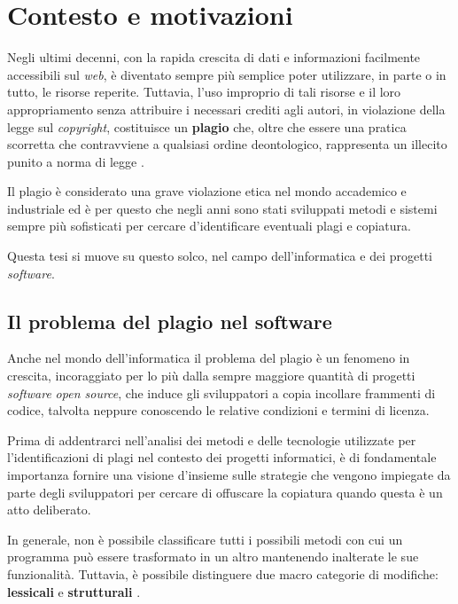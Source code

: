 \chapter{Contesto e motivazioni}
\label{chapter:context-and-motivations}

Negli ultimi decenni, con la rapida crescita di dati e informazioni facilmente accessibili sul \textit{web}, è diventato sempre più semplice poter utilizzare, in parte o in tutto, le risorse reperite.
%
Tuttavia, l'uso improprio di tali risorse e il loro appropriamento senza attribuire i necessari crediti agli autori, in violazione della legge sul \textit{copyright}, costituisce un \textbf{plagio} \cite{britannica} che, oltre che essere una pratica scorretta che contravviene a qualsiasi ordine deontologico, rappresenta un illecito punito a norma di legge \cite{copyright-law-italia}.


Il plagio è considerato una grave violazione etica nel mondo accademico e industriale ed è per questo che negli anni sono stati sviluppati metodi e sistemi sempre più sofisticati per cercare d'identificare eventuali plagi e copiatura.

Questa tesi si muove su questo solco, nel campo dell'informatica e dei progetti \textit{software}.

\section{Il problema del plagio nel software}
Anche nel mondo dell'informatica il problema del plagio è un fenomeno in crescita, incoraggiato per lo più dalla sempre maggiore quantità di progetti \textit{software} \textit{open source}, che induce gli sviluppatori a copia incollare frammenti di codice, talvolta neppure conoscendo le relative condizioni e termini di licenza.

Prima di addentrarci nell'analisi dei metodi e delle tecnologie utilizzate per l'identificazioni di plagi nel contesto dei progetti informatici, è di fondamentale importanza fornire una visione d'insieme sulle strategie che vengono impiegate da parte degli sviluppatori per cercare di offuscare la copiatura quando questa è un atto deliberato.

In generale, non è possibile classificare tutti i possibili metodi con cui un programma può essere trasformato in un altro mantenendo inalterate le sue funzionalità.
%
Tuttavia, è possibile distinguere due macro categorie di modifiche: \textbf{lessicali} e \textbf{strutturali} \cite{joy-99}.

